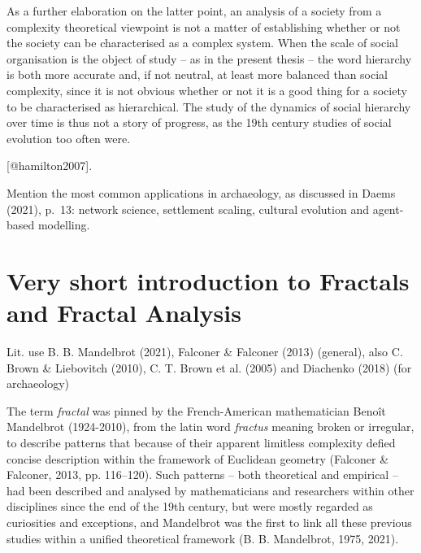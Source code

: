 \documentclass[
  12pt,
]{book}
\begin{document}
As a further elaboration on the latter point, an analysis of a society from a complexity theoretical viewpoint is not a matter of establishing whether or not the society can be characterised as a complex system. When the scale of social organisation is the object of study -- as in the present thesis -- the word hierarchy is both more accurate and, if not neutral, at least more balanced than social complexity, since it is not obvious whether or not it is a good thing for a society to be characterised as hierarchical. The study of the dynamics of social hierarchy over time is thus not a story of progress, as the 19th century studies of social evolution too often were.

{[}@hamilton2007{]}.

Mention the most common applications in archaeology, as discussed in Daems (2021), p.~13: network science, settlement scaling, cultural evolution and agent-based modelling.

\hypertarget{fractals}{%
\section{Very short introduction to Fractals and Fractal Analysis}\label{fractals}}

Lit. use B. B. Mandelbrot (2021), Falconer \& Falconer (2013) (general), also C. Brown \& Liebovitch (2010), C. T. Brown et al. (2005) and Diachenko (2018) (for archaeology)

The term \emph{fractal} was pinned by the French-American mathematician Benoît Mandelbrot (1924-2010), from the latin word \emph{fractus} meaning broken or irregular, to describe patterns that because of their apparent limitless complexity defied concise description within the framework of Euclidean geometry (Falconer \& Falconer, 2013, pp. 116--120). Such patterns -- both theoretical and empirical -- had been described and analysed by mathematicians and researchers within other disciplines since the end of the 19th century, but were mostly regarded as curiosities and exceptions, and Mandelbrot was the first to link all these previous studies within a unified theoretical framework (B. B. Mandelbrot, 1975, 2021).
\end{document}
